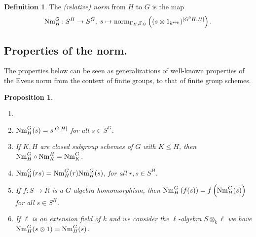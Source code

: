 \documentclass[12pt]{amsart}
\newtheorem{proposition}[theorem]{Proposition}
\theoremstyle{definition}
\newtheorem{definition}[theorem]{Definition}
\begin{document}
\begin{definition}\label{def:norm}
	The {\em (relative) norm} from $H$ to $G$ is the map
	\[
	{\rm Nm}_H^G \colon S^H\rightarrow S^G,\; 
	s\mapsto{\rm norm}_{\Gamma_H,\Gamma_G}\left((s\otimes 1_{k^{\text{sep}}})^{|G^0H:H|}\right).
	\]
\end{definition}



\subsection{Properties of the norm.}\label{sec:propnorm}
The properties below can be seen as generalizations of well-known properties of the Evens norm from the context of finite groups, to that of finite group schemes.




\begin{proposition}\label{pr:norm-properties}
	\begin{enumerate}
		\item[]
		\item ${\rm Nm}_H^G(s)=s^{|G{:}H|}$ for all $s\in S^G$.
		\item If $K,H$ are closed subgroup schemes of $G$ with $K\leq H$, then ${\rm Nm}_H^G\circ {\rm Nm}_K^H={\rm Nm}_K^G$.
		\item ${\rm Nm}_H^G(rs)={\rm Nm}_H^G(r){\rm Nm}_H^G(s)$, for all $r,s\in S^H$.
		\item If  $f \colon S\rightarrow R$ is a $G$-algebra homomorphism, then ${\rm Nm}_H^G\left(f(s)\right)=f\left({\rm Nm}_H^G(s)\right)$  for all $s\in S^H$.
		\item If $\ell$  is an extension field of $k$ and we consider the $\ell$-algebra $S \otimes_k \ell$ we have ${\rm Nm}^G_H (s \otimes 1) = {\rm Nm}^G_H(s)$.
	\end{enumerate}
\end{proposition}
\end{document}
